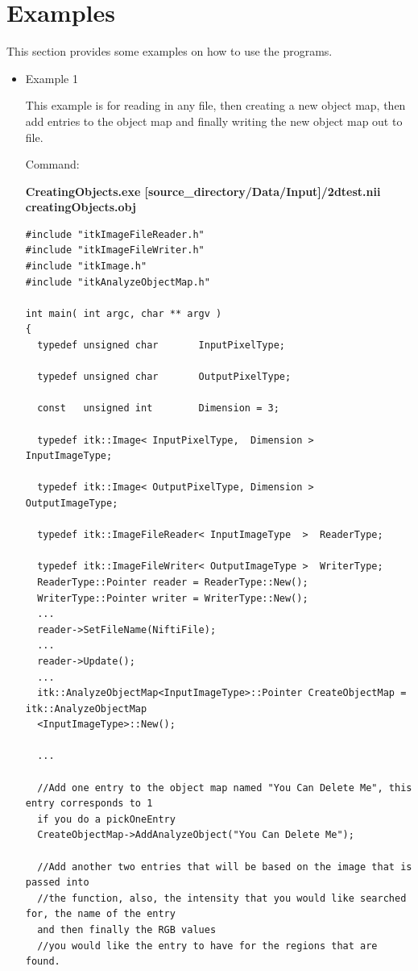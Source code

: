 \documentclass{InsightArticle}
\begin{document}
\section{Examples}

This section provides some examples on how to use the programs.
\begin{itemize}
\item Example 1 

This example is for reading in any file, then creating a new object map, then add entries to the object map and finally writing the new object map out to file.


Command:

\textbf{CreatingObjects.exe  [source\_directory/Data/Input]/2dtest.nii creatingObjects.obj}\\

\small \begin{verbatim}
#include "itkImageFileReader.h"
#include "itkImageFileWriter.h"
#include "itkImage.h"
#include "itkAnalyzeObjectMap.h"

int main( int argc, char ** argv )
{
  typedef unsigned char       InputPixelType;
  
  typedef unsigned char       OutputPixelType;
  
  const   unsigned int        Dimension = 3;
  
  typedef itk::Image< InputPixelType,  Dimension >    InputImageType;
  
  typedef itk::Image< OutputPixelType, Dimension >    OutputImageType;
  
  typedef itk::ImageFileReader< InputImageType  >  ReaderType;
  
  typedef itk::ImageFileWriter< OutputImageType >  WriterType;
  ReaderType::Pointer reader = ReaderType::New();
  WriterType::Pointer writer = WriterType::New();
  ...
  reader->SetFileName(NiftiFile);
  ...
  reader->Update();
  ...
  itk::AnalyzeObjectMap<InputImageType>::Pointer CreateObjectMap = itk::AnalyzeObjectMap
  <InputImageType>::New();
  
  ...
  
  //Add one entry to the object map named "You Can Delete Me", this entry corresponds to 1
  if you do a pickOneEntry
  CreateObjectMap->AddAnalyzeObject("You Can Delete Me");

  //Add another two entries that will be based on the image that is passed into 
  //the function, also, the intensity that you would like searched for, the name of the entry
  and then finally the RGB values
  //you would like the entry to have for the regions that are found.


\end{verbatim}
\end{itemize}
\end{document}
